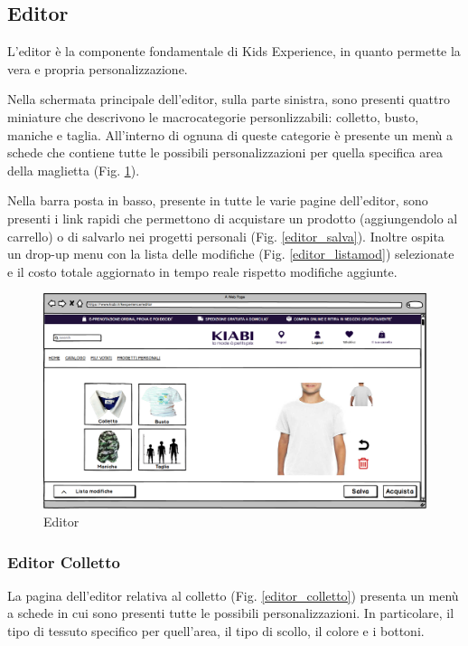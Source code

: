 \documentclass[12pt,italian,]{report}
\begin{document}
\newpage
\subsection{Editor} 

L'editor è la componente fondamentale di Kids Experience, in quanto permette la vera e propria personalizzazione.

Nella schermata principale dell'editor, sulla parte sinistra, sono presenti quattro miniature che descrivono le macrocategorie personlizzabili: colletto, busto, maniche e taglia. All'interno di ognuna di queste categorie è presente un menù a schede che contiene tutte le possibili personalizzazioni per quella specifica area della maglietta (Fig. \ref{editor}).

Nella barra posta in basso, presente in tutte le varie pagine  dell'editor, sono presenti i link rapidi che permettono di acquistare un prodotto (aggiungendolo al carrello) o di salvarlo nei progetti personali (Fig. \ref{editor_salva}). Inoltre ospita un drop-up menu con la lista delle modifiche (Fig. \ref{editor_listamod}) selezionate e il costo totale aggiornato in tempo reale rispetto modifiche aggiunte.


\begin{figure}[h]
\centering
\includegraphics{balsamiq/Editor base.png}
\caption{Editor}
\label{editor}
\end{figure}


\newpage
\subsubsection{Editor Colletto} 

La pagina dell'editor relativa al colletto (Fig. \ref{editor_colletto}) presenta un menù a schede in cui sono presenti tutte le possibili personalizzazioni. In particolare, il tipo di tessuto specifico per quell'area, il tipo di scollo, il colore e i bottoni.
\end{document}
